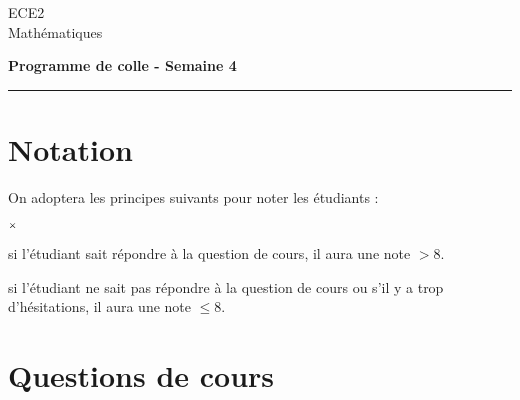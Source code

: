 \documentclass[11pt]{article}%
\begin{document}
\begin{flushleft}
ECE2 \\
Mathématiques
\end{flushleft}


\vspace{0.1cm}

\begin{center}
\textbf{\Large{Programme de colle - Semaine 4}}
\end{center}

\hrule

\vspace*{0,2cm}

\section*{Notation}

On adoptera les principes suivants pour noter les étudiants :
\begin{noliste}{$\scriptstyle \times$}
\item si l'étudiant sait répondre à la question de cours, il 
aura une note $>8$.
\item si l'étudiant ne sait pas répondre à la question de 
cours ou s'il y a trop d'hésitations, il aura une note $\leq 8$.
\end{noliste}

\section*{Questions de cours}
\end{document}
